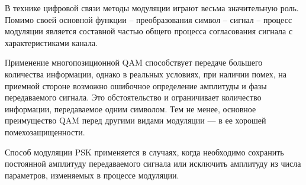 \documentclass[a4paper,12pt]{article}
\begin{document}
В технике цифровой связи методы модуляции играют весьма значительную роль. Помимо своей основной функции – преобразования символ – сигнал – процесс модуляции является составной частью общего процесса согласования сигнала с характеристиками канала.

Применение многопозиционной QAM способствует передаче большего количества информации, однако в реальных усло­виях, при наличии помех, на приемной стороне возможно ошибочное определение амплитуды и фазы передаваемого сигнала. Это обстоя­тельство и ограничивает количество информации, передаваемое од­ним символом. Тем не менее, основное преимущество QAM перед другими видами модуляции — в ее хорошей помехозащищенности. 

Способ модуляции PSK применяется в случаях, когда необхо­димо сохранить постоянной амплитуду передаваемого сигнала или исключить амплитуду из числа параметров, изменяемых в процессе модуляции. 
\end{document}
